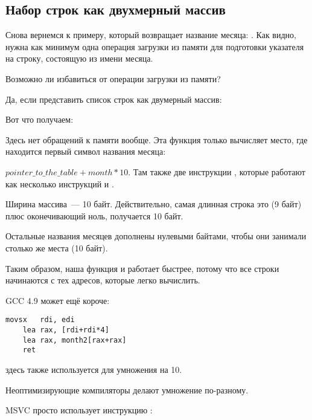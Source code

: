 \subsection{Набор строк как двухмерный массив}

Снова вернемся к примеру, который возвращает название месяца: .
Как видно, нужна как минимум одна операция загрузки из памяти для подготовки указателя на строку,
состоящую из имени месяца.

Возможно ли избавиться от операции загрузки из памяти?

Да, если представить список строк как двумерный массив:



Вот что получаем:



Здесь нет обращений к памяти вообще.
Эта функция только вычисляет место, где находится первый символ названия месяца:
 
$pointer\_to\_the\_table + month * 10$.
Там также две инструкции \LEA, которые работают как несколько инструкций \MUL и \MOV.

Ширина массива~--- 10 байт. 
Действительно, самая длинная строка это  (9 байт) плюс оконечивающий ноль, получается 10 байт.

Остальные названия месяцев дополнены нулевыми байтами, чтобы они занимали столько же места (10 байт).

Таким образом, наша функция и работает быстрее, потому что все строки начинаются с тех адресов, 
которые легко вычислить.

\Optimizing GCC 4.9 может ещё короче:

\begin{lstlisting}[caption=\Optimizing GCC 4.9 x64,style=customasmx86]
	movsx	rdi, edi
	lea	rax, [rdi+rdi*4]
	lea	rax, month2[rax+rax]
	ret
\end{lstlisting}

\LEA здесь также используется для умножения на 10.

Неоптимизирующие компиляторы делают умножение по-разному.



\NonOptimizing MSVC просто использует инструкцию \IMUL:

